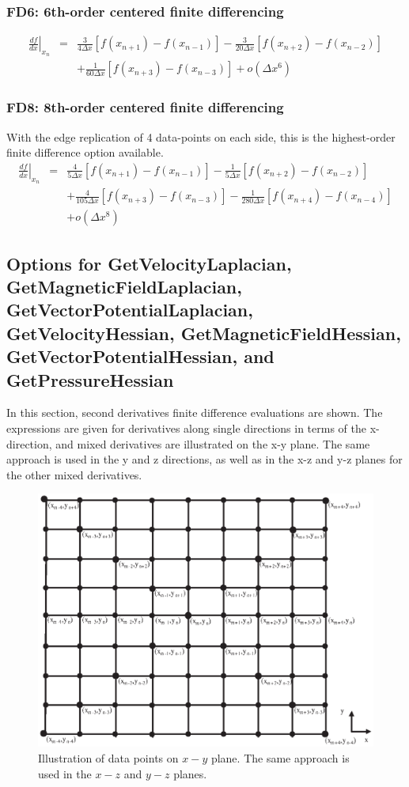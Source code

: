 \documentclass[11pt]{article}
\def\bea{\begin{eqnarray}}
\def\eea{\end{eqnarray}}
\begin{document}
\subsubsection*{FD6: 6th-order centered finite differencing}

\bea \left.\frac{df}{dx}\right|_{x_n} &=&
\frac{3}{4\Delta
x}[f(x_{n+1})-f(x_{n-1})]-\frac{3}{20\Delta x}[f(x_{n+2})-f(x_{n-2})]\nonumber\\
&&+\frac{1}{60\Delta x}[f(x_{n+3})-f(x_{n-3})]+o(\Delta x^6) \eea

\subsubsection*{FD8: 8th-order centered finite differencing}
With the edge replication of 4 data-points on each side, this is the highest-order finite difference option available.
\bea \left.\frac{df}{dx}\right|_{x_n} &=&
\frac{4}{5\Delta
x}[f(x_{n+1})-f(x_{n-1})]-\frac{1}{5\Delta x}[f(x_{n+2})-f(x_{n-2})]\nonumber\\
&&+\frac{4}{105\Delta x}[f(x_{n+3})-f(x_{n-3})]-\frac{1}{280\Delta
x}[f(x_{n+4})-f(x_{n-4})]\nonumber\\
&& +o(\Delta x^8) \eea

\subsection{Options for GetVelocityLaplacian, GetMagneticFieldLaplacian, GetVectorPotentialLaplacian, GetVelocityHessian, GetMagneticFieldHessian, GetVectorPotentialHessian, and
GetPressureHessian}
In this section, second derivatives finite difference evaluations are shown. The expressions are
given for derivatives along single directions in terms of the x-direction, and mixed derivatives are
illustrated on the x-y plane. The same approach is used in the y and z directions, as well as in the x-z and y-z planes
for the other mixed derivatives.
 \begin{figure}[h]
\begin{minipage}{\linewidth}
\centering\includegraphics[width=1.0\linewidth]{2DGrid.eps}
\end{minipage} \caption{Illustration of data points on $x-y$ plane. The same approach is used in the $x-z$ and $y-z$ planes.}\label{2DGrid}
\end{figure}
\end{document}
